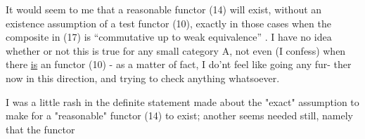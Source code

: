 It would seem to me that a reasonable functor (14) will exist,
without an existence assumption of a test functor (10), exactly in
those cases when the composite  in (17) is ``commutative up to
weak equivalence'' . I have no idea whether or not this is true for
any small category A, not even (I confess) when there \uline{is} an 
functor (10) - as a matter of fact, I do'nt feel like going any fur-%
ther now in this direction, and trying to check anything whatsoever.

I was a little rash in the definite statement  made about
the "exact" assumption to make for a "reasonable" functor (14) to
exist; another seems needed still, namely that the functor


